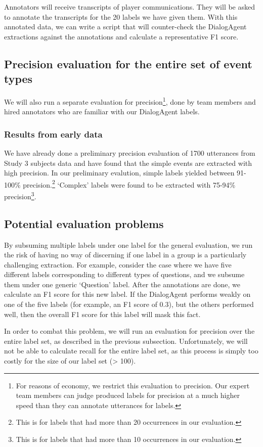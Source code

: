 Annotators will receive transcripts of player communications. They will be
asked to annotate the transcripts for the 20 labels we have given them. With
this annotated data, we can write a script that will counter-check the
DialogAgent extractions against the annotations and calculate a representative
F1 score.

\subsection{Precision evaluation for the entire set of event types}

We will also run a separate evaluation for precision\footnote{For reasons of
economy, we restrict this evaluation to precision. Our expert team members can
judge produced labels for precision at a much higher speed than they can
annotate utterances for labels.}, done by team members and hired annotators who
are familiar with our DialogAgent labels.


\subsubsection{Results from early data} 

We have already done a preliminary precision evaluation of 1700 utterances from
Study 3 subjects data and have found that the simple events are extracted with
high precision.  In our preliminary evalution, simple labels yielded between
91-100\% precision.\footnote{This is for labels that had more than 20
occurrences in our evaluation.} `Complex' labels were found to be extracted
with 75-94\% precision\footnote{This is for labels that had more than 10
occurrences in our evaluation.}.

\subsection{Potential evaluation problems}

By subsuming multiple labels under one label for the general evaluation, we run
the risk of having no way of discerning if one label in a group is a
particularly challenging extraction. For example, consider the case where we
have five different labels corresponding to different types of questions, and
we subsume them under one generic `Question' label. After the annotations are
done, we calculate an F1 score for this new label. If the DialogAgent performs
weakly on one of the five labels (for example, an F1 score of 0.3), but the
others performed well, then the overall F1 score for this label will mask this
fact.

In order to combat this problem, we will run an evaluation for precision over
the entire label set, as described in the previous subsection. Unfortunately,
we will not be able to calculate recall for the entire label set, as this
process is simply too costly for the size of our label set (> 100).
